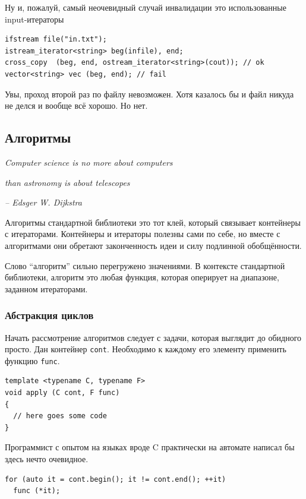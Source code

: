 \documentclass[a4paper,12pt,oneside]{article}
\begin{document}
Ну и, пожалуй, самый неочевидный случай инвалидации это использованные input-итераторы

\begin{lstlisting}
ifstream file("in.txt");
istream_iterator<string> beg(infile), end;
cross_copy  (beg, end, ostream_iterator<string>(cout)); // ok
vector<string> vec (beg, end); // fail
\end{lstlisting}

Увы, проход второй раз по файлу невозможен. Хотя казалось бы и файл никуда не делся и вообще всё хорошо. Но нет.

\pagebreak
\subsection{Алгоритмы}

\hfill\textit{Computer science is no more about computers}

\hfill\textit{than astronomy is about telescopes}{\vspace{0.5em}}

\hfill\textit{-- Edsger W. Dijkstra}

Алгоритмы стандартной библиотеки это тот клей, который связывает контейнеры с итераторами. Контейнеры и итераторы полезны сами по себе, но вместе с алгоритмами они обретают законченность идеи и силу подлинной обобщённости.

Слово ``алгоритм'' сильно перегружено значениями. В контексте стандартной библиотеки, алгоритм это любая функция, которая оперирует на диапазоне, заданном итераторами.

\subsubsection{Абстракция циклов}

Начать рассмотрение алгоритмов следует с задачи, которая выглядит до обидного просто. Дан контейнер \lstinline!cont!. Необходимо к каждому его элементу применить функцию \lstinline!func!. 

\begin{lstlisting}
template <typename C, typename F> 
void apply (C cont, F func) 
{
  // here goes some code
}
\end{lstlisting}

Программист с опытом на языках вроде C практически на автомате написал бы здесь нечто очевидное.

\begin{lstlisting}
for (auto it = cont.begin(); it != cont.end(); ++it)
  func (*it);
\end{lstlisting}
\end{document}
